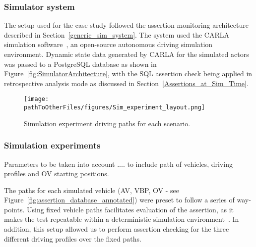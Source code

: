 \subsubsection{Simulator system}

The setup used for the case study followed the assertion monitoring architecture described in Section~\ref{generic_sim_system}. 
%
The system used the CARLA simulation software~\cite{CarlaSimulator}, an open-source autonomous driving simulation environment. Dynamic state data generated by CARLA for the simulated actors was passed to a PostgreSQL database as shown in Figure~\ref{fig:SimulatorArchitecture}, with the SQL assertion check being applied in retrospective analysis mode as discussed in Section~\ref{Assertions_at_Sim_Time}.
%




\begin{figure}
    \centering
    \texttt{[image: \\pathToOtherFiles/figures/Sim\_experiment\_layout.png]}
    \caption{Simulation experiment driving paths for each scenario.}
    \label{fig:Sim_experiment_layout}
\end{figure} 

\subsubsection{Simulation experiments}

Parameters to be taken into account .... to include path of vehicles, driving profiles and OV starting positions.

The paths for each simulated vehicle (AV, VBP, OV - see Figure~\ref{fig:assertion_database_annotated}) were preset to follow a series of way-points. Using fixed vehicle paths facilitates evaluation of the assertion, as it makes the test repeatable within a deterministic simulation environment~\cite{chance2021}. In addition, this setup allowed us to perform assertion checking for the three different driving profiles over the fixed paths. %

